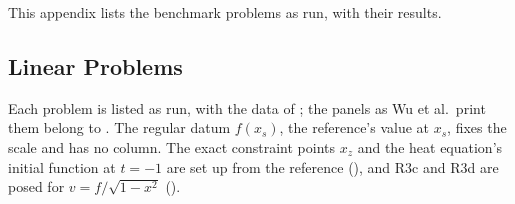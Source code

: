 This appendix lists the benchmark problems as run, with their results.

\subsection{Linear Problems}
\label{app:catalogue-linear}

Each problem is listed as run, with the data of ; the panels as Wu et al.\ print them belong to . The regular datum $f(x_s)$, the reference's value at $x_s$, fixes the scale and has no column. The exact constraint points $x_z$ and the heat equation's initial function at $t=-1$ are set up from the reference (), and R3c and R3d are posed for $v=f/\sqrt{1-x^2}$ ().

